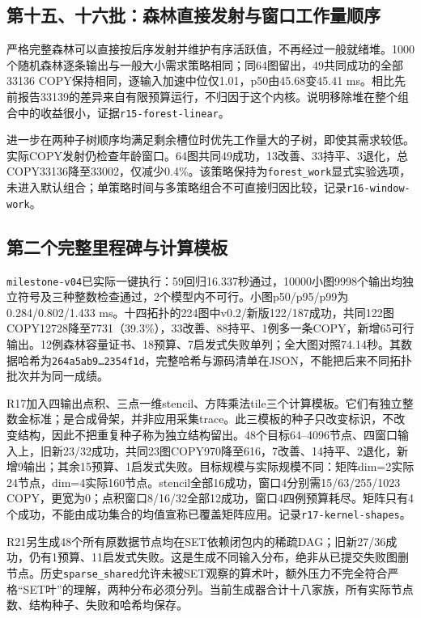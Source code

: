 \documentclass[UTF8,11pt,fontset=fandol]{ctexart}
\begin{document}
\subsection{第十五、十六批：森林直接发射与窗口工作量顺序}
严格完整森林可以直接按后序发射并维护有序活跃值，不再经过一般就绪堆。1000个随机森林逐条输出与一般大小需求策略相同；同64图留出，49共同成功的全部33136 COPY保持相同，逐输入加速中位仅1.01，p50由45.68变45.41 ms。相比先前报告33139的差异来自有限预算运行，不归因于这个内核。说明移除堆在整个组合中的收益很小，证据\texttt{r15-forest-linear}。

进一步在两种子树顺序均满足剩余槽位时优先工作量大的子树，即使其需求较低。实际COPY发射仍检查年龄窗口。64图共同49成功，13改善、33持平、3退化，总COPY33136降至33002，仅减少0.4\%。该策略保持为\texttt{forest\_work}显式实验选项，未进入默认组合；单策略时间与多策略组合不可直接归因比较，记录\texttt{r16-window-work}。

\subsection{第二个完整里程碑与计算模板}
\texttt{milestone-v04}已实际一键执行：59回归16.337秒通过，10000小图9998个输出均独立符号及三种整数检查通过，2个模型内不可行。小图p50/p95/p99为0.284/0.802/1.433 ms。十四拓扑的224图中v0.2/新版122/187成功，共同122图COPY12728降至7731（39.3\%），33改善、88持平、1例多一条COPY，新增65可行输出。12例森林容量证书、18预算、7启发式失败单列；全大图对照74.14秒。其数据哈希为\texttt{264a5ab9\ldots2354f1d}，完整哈希与源码清单在JSON，不能把后来不同拓扑批次并为同一成绩。

R17加入四输出点积、三点一维stencil、方阵乘法tile三个计算模板。它们有独立整数金标准；是合成骨架，并非应用采集trace。此三模板的种子只改变标识，不改变结构，因此不把重复种子称为独立结构留出。48个目标64--4096节点、四窗口输入上，旧新23/32成功，共同23图COPY970降至616，7改善、14持平、2退化，新增9输出；其余15预算、1启发式失败。目标规模与实际规模不同：矩阵dim=2实际24节点，dim=4实际160节点。stencil全部16成功，窗口4分别需15/63/255/1023 COPY，更宽为0；点积窗口8/16/32全部12成功，窗口4四例预算耗尽。矩阵只有4个成功，不能由成功集合的均值宣称已覆盖矩阵应用。记录\texttt{r17-kernel-shapes}。

R21另生成48个所有原数据节点均在SET依赖闭包内的稀疏DAG；旧新27/36成功，仍有1预算、11启发式失败。这是生成不同输入分布，绝非从已提交失败图删节点。历史\texttt{sparse\_shared}允许未被SET观察的算术叶，额外压力不完全符合严格“SET叶”的理解，两种分布必须分列。当前生成器合计十八家族，所有实际节点数、结构种子、失败和哈希均保存。
\end{document}
